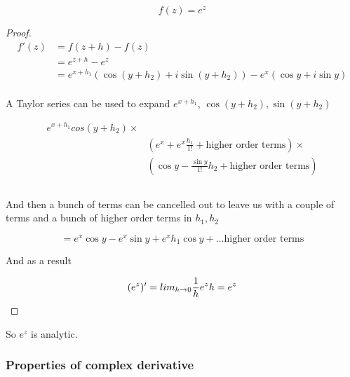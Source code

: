 \documentclass[../notes.tex]{subfiles}
\begin{document}
\begin{example}
	\begin{equation}
		f(z) = e^z
	\end{equation}
	
	
	\begin{proof}
	\begin{equation}
		\begin{split}
			 f'(z)&= f(z+h) - f(z)  \\
			 &= e^{z+h} - e^z \\
			 &=  e^{x+h_1}(\cos(y+h_2) + i \sin(y+h_2)) - e^x (\cos y + i \sin y) \\
		\end{split}
	\end{equation}

	A Taylor series can be used to expand $ e^{x+h_1} $, $ \cos(y+h_2), \sin (y+h_2) $ 

	\begin{equation}
		\begin{split}
			e^{x+h_1} cos(y+h_2) \times &\\
																	&\left( e^x + e^x \frac{h_1}{1!} + \text{higher order terms} \right) \times \\
																	& \left( \cos y - \frac{\sin y}{1!} h_2 + \text{higher order terms} \right)
		\end{split}
	\end{equation}
	

	\begin{equation}
	\end{equation}

	And then a bunch of terms can be cancelled out to leave us with a couple of terms and a bunch of higher order terms in $ h_1, h_2 $ 

	\begin{equation}
		= e^x \cos y - e^x \sin y + e^x h_1 \cos y + \ldots \text{higher order terms}
	\end{equation}

	And as a result

	\begin{equation}
		(e^z)' = \\lim_{h \to 0} \frac{1}{h} e^z h = e^z
	\end{equation}

		
	\end{proof}

	So $ e^z $ is analytic.
\end{example}


\subsubsection{Properties of complex derivative}
\end{document}
